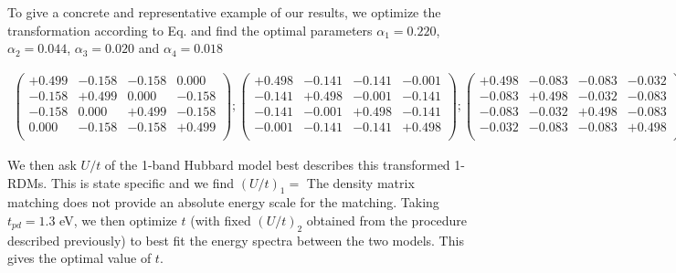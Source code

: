 To give a concrete and representative example of our results, we optimize the transformation 
according to Eq. and find the optimal parameters $\alpha_1=0.220$, $\alpha_2=0.044$, $\alpha_3=0.020$ 
and $\alpha_4=0.018$ 
\begin{small}
\begin{eqnarray}
\left(
\begin{array}{cccc}
+0.499 & -0.158 & -0.158 & 0.000  \\
-0.158 & +0.499 &  0.000 & -0.158 \\
-0.158 &  0.000 & +0.499 & -0.158 \\
 0.000 & -0.158 & -0.158 & +0.499 \\
\end{array}
\right);
\left(
\begin{array}{cccc}
+0.498 & -0.141 & -0.141 & -0.001  \\
-0.141 & +0.498 & -0.001 & -0.141 \\
-0.141 & -0.001 & +0.498 & -0.141 \\
-0.001 & -0.141 & -0.141 & +0.498 \\
\end{array}
\right)
;\left(
\begin{array}{cccc}
+0.498 & -0.083 & -0.083 & -0.032  \\
-0.083 & +0.498 & -0.032 & -0.083 \\
-0.083 & -0.032 & +0.498 & -0.083 \\
-0.032 & -0.083 & -0.083 & +0.498 \\
\end{array}
\right)
\end{eqnarray}
\end{small}
We then ask $U/t$ of the 1-band Hubbard model best describes this transformed 
1-RDMs. This is state specific and we find $(U/t)_1 = $ 
The density matrix matching does not provide an absolute energy scale for the matching. 
Taking $t_{pd} = 1.3$ eV, we then optimize $t$ (with fixed $(U/t)_2$ obtained from the procedure described 
previously) to best fit the energy spectra between the two models. This gives the optimal value of 
$t$. 


